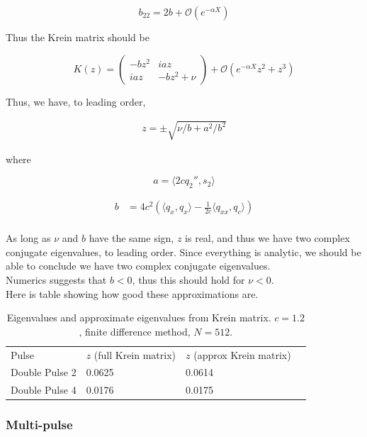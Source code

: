 \documentclass[12pt]{article}
\begin{document}
\[
b_{22} = 2b + \mathcal{O}(e^{-\alpha X})
\]

Thus the Krein matrix should be

\begin{equation}
K(z) = \begin{pmatrix}
-b z^2 & i a z \\
i a z & -b z^2 + \nu
\end{pmatrix} + \mathcal{O}(e^{-\alpha X} z^2 + z^3)
\end{equation}

Thus, we have, to leading order,

\begin{align*}
z = \pm \sqrt{\nu / b + a^2/ b^2 }
\end{align*} 

where 

\[
a = \langle 2c q_2'', s_2 \rangle
\]

\begin{align*}
b &= 4 c^2 \left( \langle q_x, q_x \rangle - \frac{1}{2c} \langle q_{xx}, q_c \rangle \right)  \\
\end{align*}

As long as $\nu$ and $b$ have the same sign, $z$ is real, and thus we have two complex conjugate eigenvalues, to leading order. Since everything is analytic, we should be able to conclude we have two complex conjugate eigenvalues.\\

Numerics suggests that $b < 0$, thus this should hold for $\nu < 0$.\\

Here is table showing how good these approximations are.

\begin{table}[H]
\begin{tabular}{llll}
Pulse & $z$ (full Krein matrix) & $z$ (approx Krein matrix)\\
Double Pulse 2  & 0.0625 & 0.0614 \\
Double Pulse 4  & 0.0176 & 0.0175 \\
\end{tabular}
\caption{Eigenvalues and approximate eigenvalues from Krein matrix. $c = 1.2$, finite difference method, $N = 512$. }
\end{table}

\subsubsection{Multi-pulse}
\end{document}
